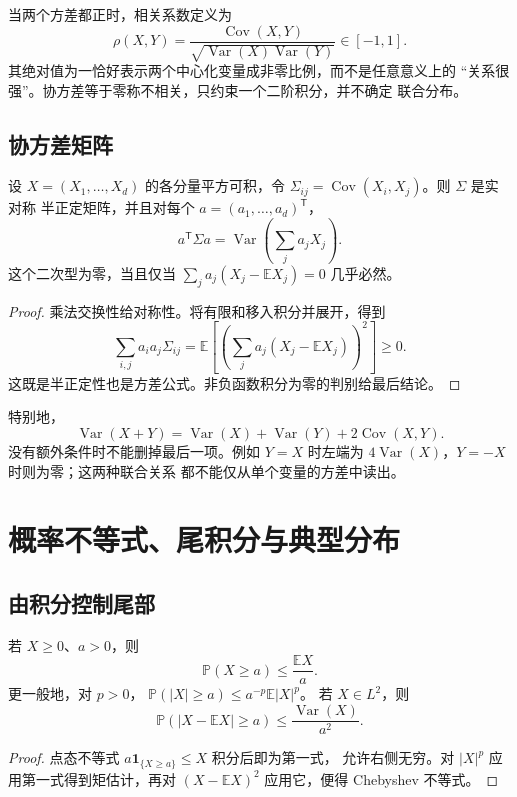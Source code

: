 当两个方差都正时，相关系数定义为
\[
 \rho(X,Y)=\frac{\operatorname{Cov}(X,Y)}
 {\sqrt{\operatorname{Var}(X)\operatorname{Var}(Y)}}\in[-1,1].
\]
其绝对值为一恰好表示两个中心化变量成非零比例，而不是任意意义上的
“关系很强”。协方差等于零称不相关，只约束一个二阶积分，并不确定
联合分布。

\subsection{协方差矩阵}

\begin{proposition}\label{prop:covariance-matrix-positive}
设 \(X=(X_1,\ldots,X_d)\) 的各分量平方可积，令
\(\Sigma_{ij}=\operatorname{Cov}(X_i,X_j)\)。则 \(\Sigma\) 是实对称
半正定矩阵，并且对每个 \(a=(a_1,\ldots,a_d)^{\mathsf T}\)，
\begin{equation}\label{eq:covariance-quadratic-form}
 a^{\mathsf T}\Sigma a
 =\operatorname{Var}\left(\sum_ja_jX_j\right).
\end{equation}
这个二次型为零，当且仅当
\(\sum_ja_j(X_j-\mathbb E X_j)=0\) 几乎必然。
\end{proposition}
\begin{proof}
乘法交换性给对称性。将有限和移入积分并展开，得到
\[
 \sum_{i,j}a_ia_j\Sigma_{ij}
 =\mathbb E\left[\left(\sum_ja_j(X_j-\mathbb E X_j)\right)^2\right]
 \ge0.
\]
这既是半正定性也是方差公式。非负函数积分为零的判别给最后结论。
\end{proof}

特别地，
\[
 \operatorname{Var}(X+Y)=\operatorname{Var}(X)+\operatorname{Var}(Y)
                         +2\operatorname{Cov}(X,Y).
\]
没有额外条件时不能删掉最后一项。例如 \(Y=X\) 时左端为
\(4\operatorname{Var}(X)\)，\(Y=-X\) 时则为零；这两种联合关系
都不能仅从单个变量的方差中读出。

\section{概率不等式、尾积分与典型分布}
\label{sec:probability-inequalities-distributions}

\subsection{由积分控制尾部}

\begin{theorem}
\label{thm:probability-markov-chebyshev}
若 \(X\ge0\)、\(a>0\)，则
\[
 \mathbb P(X\ge a)\le\frac{\mathbb E X}{a}.
\]
更一般地，对 \(p>0\)，
\(\mathbb P(|X|\ge a)\le a^{-p}\mathbb E|X|^p\)。
若 \(X\in L^2\)，则
\[
 \mathbb P(|X-\mathbb E X|\ge a)
 \le\frac{\operatorname{Var}(X)}{a^2}.
\]
\end{theorem}
\begin{proof}
点态不等式 \(a\mathbf1_{\{X\ge a\}}\le X\) 积分后即为第一式，
允许右侧无穷。对 \(|X|^p\) 应用第一式得到矩估计，再对
\((X-\mathbb E X)^2\) 应用它，便得 Chebyshev 不等式。
\end{proof}

